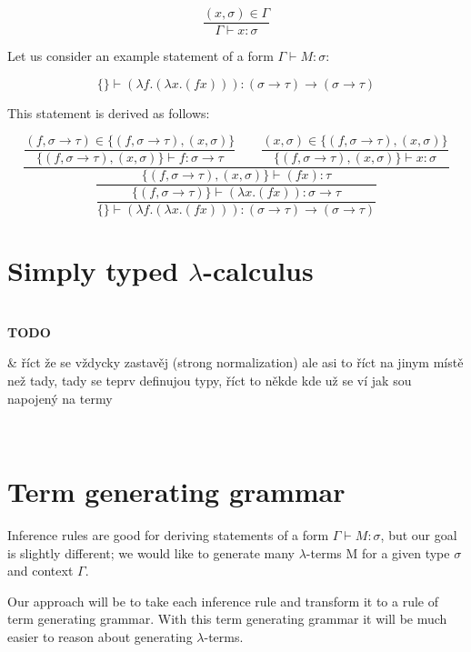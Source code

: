 \documentclass[12pt,a4paper]{report}
\newcommand{\Lets}{Let us\xspace}
\newcommand{\lterms}{$\lambda$-terms\xspace}
\newcommand{\turst}[3]{$#1 \vdash #2 : #3$\xspace}
\newcommand{\GMS}{\turst{\Gamma}{M}{\sigma}}
\newenvironment{todo}
{ ~\\[0.5em]
  {\color{red}\textbf{TODO}}
  \begin{easylist}[itemize]}
{ \end{easylist}
  ~}
\begin{document}
	\begin{equation*}
		\frac{( x , \sigma )  \in \Gamma}
		     {\Gamma \vdash x : \sigma}
	\end{equation*}	
	
	\Lets consider an example statement of a form \GMS :
	
	\[
		\{\} \vdash (\lambda f . (\lambda x . (f x) )) : 
		(\sigma \rightarrow \tau) \rightarrow ( \sigma \rightarrow \tau ) 
	\]
		
	This statement is derived as follows: 
	
	\begin{equation*}
	\dfrac{
		\dfrac{ (f,\sigma \rightarrow \tau) \in \{ (f,\sigma \rightarrow \tau) , (x,\sigma)  \}  }
		     { \{ (f,\sigma \rightarrow \tau) , (x,\sigma)  \} \vdash f : \sigma \rightarrow \tau }
		\qquad
		\dfrac{ (x,\sigma) \in \{ (f,\sigma \rightarrow \tau) , (x,\sigma)  \}  }
		     { \{ (f,\sigma \rightarrow \tau) , (x,\sigma)  \} \vdash x : \sigma }
		 }
		 {
			\dfrac{		 	
		 		\{ (f,\sigma \rightarrow \tau) , (x,\sigma)  \} \vdash (f x) : \tau
		 	}{
				\dfrac{\{ (f,\sigma \rightarrow \tau) \} \vdash (\lambda x . (f x) ) : 
				\sigma \rightarrow \tau}
				{ \{ \} \vdash (\lambda f . (\lambda x . (f x) ) ) 
				  : (\sigma \rightarrow \tau) \rightarrow (\sigma \rightarrow \tau) }
		 	}
		 }
	\end{equation*}		


\section{Simply typed $\lambda$-calculus}

\begin{todo}
   & říct že se vždycky zastavěj (strong normalization) ale
     asi to říct na jinym místě než tady, tady se teprv definujou typy, 
     říct to někde kde už se ví jak sou napojený na termy    
\end{todo}

	
\section{Term generating grammar}

Inference rules are good for deriving statements of a form \GMS, but our
goal is slightly different; we would like to generate many \lterms M for a given type 
$\sigma$ and context $\Gamma$.

Our approach will be to take each inference rule and transform it to a rule of term generating
grammar. With this term generating grammar it will be much easier to reason about generating 
\lterms.
	
\end{document}
